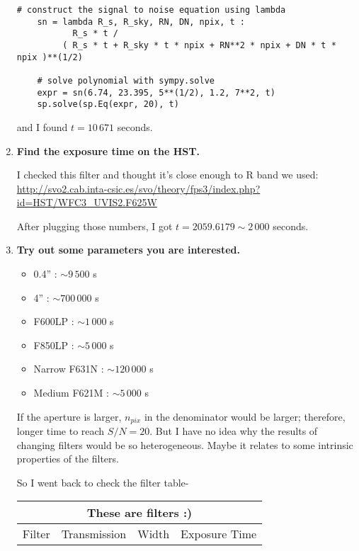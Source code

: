 \documentclass[12pt,letterpaper]{article}
\begin{document}
\begin{enumerate}
\begin{lstlisting}[style = python]
    # construct the signal to noise equation using lambda
    sn = lambda R_s, R_sky, RN, DN, npix, t : 
           R_s * t /
         ( R_s * t + R_sky * t * npix + RN**2 * npix + DN * t * npix )**(1/2)    
        
    # solve polynomial with sympy.solve
    expr = sn(6.74, 23.395, 5**(1/2), 1.2, 7**2, t)
    sp.solve(sp.Eq(expr, 20), t)
    \end{lstlisting} 

    and I found $t = 10\,671$ seconds.

    \item {\bf Find the exposure time on the HST.}
    
    I checked this filter and thought it's close enough to R band we used:
    \url{http://svo2.cab.inta-csic.es/svo/theory/fps3/index.php?id=HST/WFC3_UVIS2.F625W}
    
    After plugging those numbers, I got $t = 2059.6179 \sim 2\,000$ seconds. 
    
    \item {\bf Try out some parameters you are interested.}
    
    \begin{itemize}
        \item  0.4'' : $\sim 9\,500$ s
        \item 4''    : $\sim 700\,000$ s
        \item F600LP : $\sim 1\,000$ s
        \item F850LP  : $\sim 5\,000$ s
        \item Narrow F631N : $\sim 120\,000$ s
        \item Medium F621M : $\sim 5\,000$ s
    \end{itemize}

    If the aperture is larger, $n_{pix}$ in the denominator would be larger;
    therefore, longer time to reach $S/N = 20$.
    But I have no idea why the results of changing filters
    would be so heterogeneous.
    Maybe it relates to some intrinsic properties of the filters.
    
    So I went back to check the filter table-

    \begin{tabular}{ |p{3cm} || p{3cm}|p{3cm}|p{3cm}| }
        \hline
        \multicolumn{4}{|c|}{These are filters :)} \\
        \hline

        Filter& Transmission&     Width& Exposure Time\\
        \hline


\end{tabular}
\end{enumerate}
\end{document}
